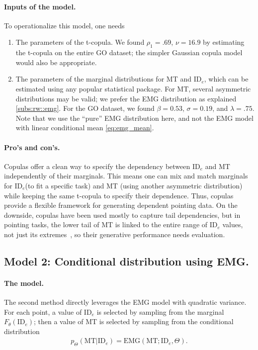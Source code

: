 \documentclass[acmlarge, manuscript,review]{acmart}
\newcommand{\mt}{\ensuremath{{\text{MT}}}\xspace}
\newcommand{\ide}{\ensuremath{{\text{ID}_e}}\xspace}
\begin{document}
\paragraph{Inputs of the model.} To operationalize this model, one needs
\begin{enumerate}
	\item The parameters of the t-copula. We found $\rho_1 = .69$, $\nu = 16.9$ by estimating the t-copula on the entire GO dataset; the simpler Gaussian copula model would also be appropriate.
	\item The parameters of the marginal distributions for MT and \ide, which can be estimated using any popular statistical package. For MT, several asymmetric distributions may be valid; we prefer the EMG distribution as explained \autoref{subs:rw::emg}. For the GO dataset, we found $\beta = 0.53$, $\sigma = 0.19$, and $\lambda= .75$. Note that we use the ``pure'' EMG distribution here, and not the EMG model with linear conditional mean \autoref{eq:emg_mean}.
\end{enumerate}


\paragraph{Pro's and con's.} Copulas offer a clean way to specify the dependency between \ide and MT independently of their marginals. This means one can mix and match marginals for \ide (\eg to fit a specific task) and MT (\eg using another asymmetric distribution) while keeping the same t-copula to specify their dependence. Thus, copulas provide a flexible framework for generating dependent pointing data.
On the downside, copulas have been used mostly to capture tail dependencies, but in pointing tasks, the lower tail of MT is linked to the entire range of \ide values, not just its extremes~\cite{gori2018tochi}, so their generative performance needs evaluation. 



\subsection{Model 2: Conditional distribution using EMG.}
\paragraph{The model.} The second method directly leverages the EMG model with quadratic variance. For each point, a value of $\ide$ is selected by sampling from the marginal $F_{\theta}(\ide)$; then a value of MT is selected by sampling from the conditional distribution
\begin{align}
	p_{\Theta}(\mt|\ide) = \text{EMG}(\mt; \ide, \Theta).
\end{align}
\end{document}
